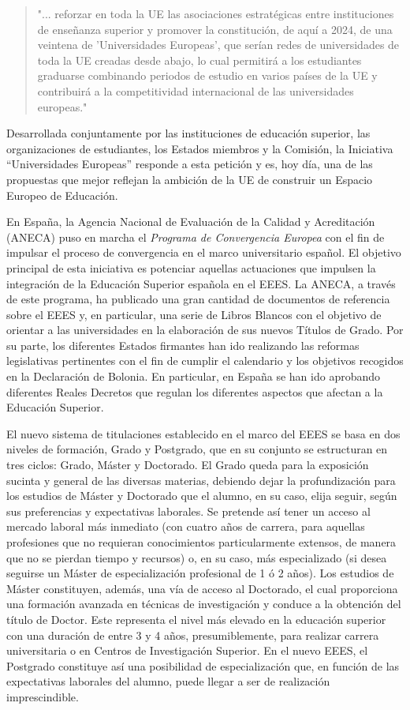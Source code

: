 \begin{quote}
"... reforzar en toda la UE las asociaciones estratégicas entre instituciones de enseñanza superior y promover la constitución, de aquí a 2024, de una veintena de 'Universidades Europeas', que serían redes de universidades de toda la UE creadas desde abajo, lo cual permitirá a los estudiantes graduarse combinando periodos de estudio en varios países de la UE y contribuirá a la competitividad internacional de las universidades europeas."
\end{quote}

Desarrollada conjuntamente por las instituciones de educación superior, las organizaciones de estudiantes, los Estados miembros y la Comisión, la Iniciativa ``Universidades Europeas'' responde a esta petición y es, hoy día, una de las propuestas que mejor reflejan la ambición de la UE de construir un Espacio Europeo de Educación.

En España, la Agencia Nacional de Evaluación de la Calidad y Acreditación (ANECA) puso en marcha el {\it Programa de Convergencia Europea} con el fin de impulsar el proceso de convergencia en el marco universitario español. El objetivo principal de esta iniciativa es potenciar aquellas actuaciones que impulsen la integración de la Educación Superior española en el EEES. La ANECA, a través de este programa, ha publicado una gran cantidad de documentos de referencia sobre el EEES y, en particular, una serie de Libros Blancos con el objetivo de orientar a las universidades en la elaboración de sus nuevos Títulos de Grado. Por su parte, los diferentes Estados firmantes han ido realizando las reformas legislativas pertinentes con el fin de cumplir el calendario y los objetivos recogidos en la Declaración de Bolonia. En particular, en España se han ido aprobando diferentes Reales Decretos que regulan los diferentes aspectos que afectan a la Educación Superior.

El nuevo sistema de titulaciones establecido en el marco del EEES se basa en dos niveles de formación, Grado y Postgrado, que en su conjunto se estructuran en tres ciclos: Grado, Máster y Doctorado. El Grado queda para la exposición sucinta y general de las diversas materias, debiendo dejar la profundización para los estudios de Máster y Doctorado que el alumno, en su caso, elija seguir, según sus preferencias y expectativas laborales. Se pretende así tener un acceso al mercado laboral más inmediato (con cuatro años de carrera, para aquellas profesiones que no requieran conocimientos particularmente extensos, de manera que no se pierdan tiempo y recursos) o, en su caso, más especializado (si desea seguirse un Máster de especialización profesional de 1 ó 2 años). Los estudios de Máster constituyen, además, una vía de acceso al Doctorado, el cual proporciona una formación avanzada en técnicas de investigación y conduce a la obtención del título de Doctor. Este representa el nivel más elevado en la educación superior con una duración de entre 3 y 4 años, presumiblemente, para realizar carrera universitaria o en Centros de Investigación Superior. En el nuevo EEES, el Postgrado constituye así una posibilidad de especialización que, en función de las expectativas laborales del alumno, puede llegar a ser de realización imprescindible.


